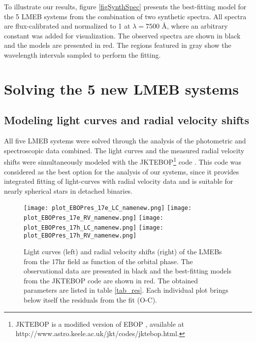 \documentclass[fleqn,usenatbib]{mnras}
\begin{document}
To illustrate our results, figure \ref{figSynthSpec} presents the best-fitting model for the 5 LMEB systems from the combination of two synthetic spectra. All spectra are flux-calibrated and normalized to 1 at $\lambda = 7500$ \AA, where an arbitrary constant was added for visualization. The observed spectra are shown in black and the models are presented in red. The regions featured in gray show the wavelength intervals sampled to perform the fitting.



\section{Solving the 5 new LMEB systems}\label{solve}

\subsection{Modeling light curves and radial velocity shifts}

All five LMEB systems were solved through the analysis of the photometric and spectroscopic data combined. 
The light curves and the measured radial velocity shifts were simultaneously modeled with the JKTEBOP\footnote{JKTEBOP is a modified version of EBOP \citep[Eclipsing Binary Orbit Program,][]{Etzel81,Popper81}, available at http://www.astro.keele.ac.uk/jkt/codes/jktebop.html.} code \citep{Southworth04,Southworth13}. This code was considered as the best option for the analysis of our systems, since it provides integrated fitting of light-curves with radial velocity data and is suitable for nearly spherical stars in detached binaries.


\begin{figure*}
\begin{center}
\texttt{[image: plot\_EBOPres\_17e\_LC\_namenew.png]}
\texttt{[image: plot\_EBOPres\_17e\_RV\_namenew.png]}
\texttt{[image: plot\_EBOPres\_17h\_LC\_namenew.png]}
\texttt{[image: plot\_EBOPres\_17h\_RV\_namenew.png]}
\caption{Light curves (left) and radial velocity shifts (right) of the LMEBs from the 17hr field as function of the orbital phase. The observational data are presented in black and the best-fitting models from the JKTEBOP code are shown in red. The obtained parameters are listed in table \ref{tab_res}. Each individual plot brings below itself the residuals from the fit (O-C).}
\label{figmodelfit17hr}
\end{center}
\end{figure*}
\end{document}
